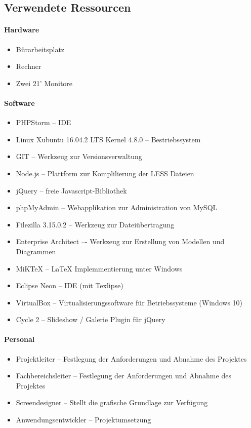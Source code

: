 \subsection{Verwendete Ressourcen}
\label{list:Ressourcenplanung}

\paragraph{Hardware}
\begin{itemize}
	\item Bürarbeitsplatz
	\item Rechner
	\item Zwei 21' Monitore
\end{itemize}

\paragraph{Software}
\begin{itemize}
  \item PHPStorm -- \ac{IDE}
	\item Linux Xubuntu 16.04.2 LTS Kernel 4.8.0 -- Bestriebssystem
	\item GIT -- Werkzeug zur Versionsverwaltung
	\item Node.js -- Plattform zur Komplilierung der LESS Dateien
	\item jQuery -- freie Javascript-Bibliothek	
	\item phpMyAdmin -- Webapplikation zur Administration von MySQL
	\item Filezilla 3.15.0.2 -- Werkzeug zur Dateiübertragung
	\item Enterprise Architect –- Werkzeug zur Erstellung von Modellen und
	Diagrammen
	\item MiKTeX -- LaTeX Implemmentierung unter Windows
	\item Eclipse Neon -- \ac{IDE} (mit Texlipse)
	\item VirtualBox -- Virtualisierungssoftware für Betriebssysteme (Windows
	10)
	\item Cycle 2 -- Slideshow / Galerie Plugin für jQuery

\end{itemize}

\paragraph{Personal}
\begin{itemize}
	\item Projektleiter -- Festlegung der Anforderungen und Abnahme des Projektes

	\item Fachbereichsleiter -- Festlegung der Anforderungen und Abnahme des
	Projektes
	\item Screendesigner -- Stellt die grafische Grundlage zur Verfügung
	\item Anwendungsentwickler -- Projektumsetzung
\end{itemize}